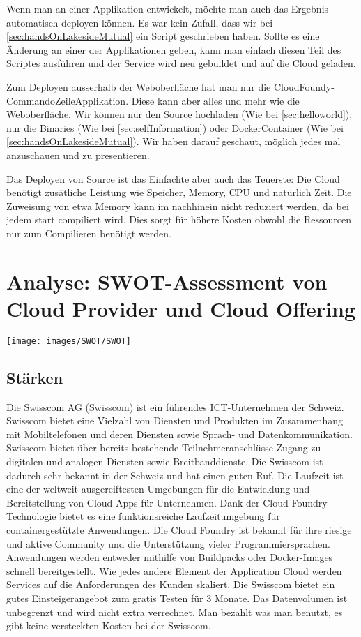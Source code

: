 \documentclass[11pt,titlepage]{article}
\begin{document}
Wenn man an einer Applikation entwickelt, möchte man auch das Ergebnis automatisch deployen können. Es war kein Zufall, dass wir bei \autoref{sec:handsOnLakesideMutual} ein Script geschrieben haben.
Sollte es eine Änderung an einer der Applikationen geben, kann man einfach diesen Teil des Scriptes ausführen und der Service wird neu gebuildet und auf die Cloud geladen.
\par\medskip
Zum Deployen ausserhalb der Weboberfläche hat man nur die CloudFoundy-CommandoZeileApplikation. Diese kann aber alles und mehr wie die Weboberfläche.
Wir können nur den Source hochladen (Wie bei \autoref{sec:helloworld}), nur die Binaries (Wie bei \autoref{sec:selfInformation}) oder DockerContainer (Wie bei \autoref{sec:handsOnLakesideMutual}). 
Wir haben darauf geschaut, möglich jedes mal anzuschauen und zu presentieren.
\par\medskip
Das Deployen von Source ist das Einfachte aber auch das Teuerste: Die Cloud benötigt zusätliche Leistung wie Speicher, Memory, CPU und natürlich Zeit. 
Die Zuweisung von etwa Memory kann im nachhinein nicht reduziert werden, da bei jedem start compiliert wird. Dies sorgt für höhere Kosten obwohl die Ressourcen nur zum Compilieren benötigt werden.

\section{Analyse: SWOT-Assessment von Cloud Provider und Cloud Offering}
\label{sec:analyseSWOT}
\begin{center}
	\centering
	\texttt{[image: images/SWOT/SWOT]}
	\label{fig:swot}
\end{center}

\subsection{Stärken}
Die Swisscom AG (Swisscom) ist ein führendes ICT-Unternehmen der Schweiz. Swisscom bietet eine Vielzahl von Diensten und Produkten im Zusammenhang mit Mobiltelefonen und deren Diensten sowie Sprach- und Datenkommunikation. Swisscom bietet über bereits bestehende Teilnehmeranschlüsse Zugang zu digitalen und analogen Diensten sowie Breitbanddienste. Die Swisscom ist dadurch sehr bekannt in der Schweiz und hat einen guten Ruf. 
Die Laufzeit ist eine der weltweit ausgereiftesten Umgebungen für die Entwicklung und Bereitstellung von Cloud-Apps für Unternehmen. Dank der Cloud Foundry-Technologie bietet es eine funktionsreiche Laufzeitumgebung für containergestützte Anwendungen.
Die Cloud Foundry ist bekannt für ihre riesige und aktive Community und die Unterstützung vieler Programmiersprachen. Anwendungen werden entweder mithilfe von Buildpacks oder Docker-Images schnell bereitgestellt. Wie jedes andere Element der Application Cloud werden Services auf die Anforderungen des Kunden skaliert.
Die Swisscom bietet ein gutes Einsteigerangebot zum gratis Testen für 3 Monate.
Das Datenvolumen ist unbegrenzt und wird nicht extra verrechnet.
Man bezahlt was man benutzt, es gibt keine versteckten Kosten bei der Swisscom.
\end{document}
